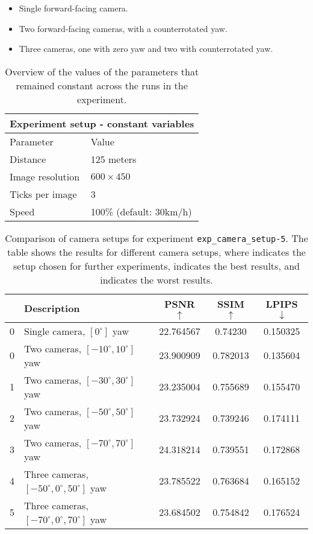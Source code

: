 \begin{itemize}
    \item Single forward-facing camera.
    \item Two forward-facing cameras, with a counterrotated yaw.
    \item Three cameras, one with zero yaw and two with counterrotated yaw.
\end{itemize}

\begin{table}[ht]
\centering
\setlength{\tabcolsep}{12pt}
\renewcommand{\arraystretch}{1.2}
\begin{tabular}{l l}
\multicolumn{2}{c}{\textbf{Experiment setup - constant variables}} \\
\hline
Parameter & Value \\
\hline
Distance  & 125 meters \\
Image resolution &  $600 \times 450$ \\
Ticks per image & 3 \\
Speed & 100\% (default: 30km/h) \\
\hline
\end{tabular}
\caption{Overview of the values of the parameters that remained constant across the runs in the experiment.}
\label{tab:camera-setup-stable-variables}
\end{table}


\begin{table}[ht]
\centering
\setlength{\tabcolsep}{6pt}
\renewcommand{\arraystretch}{1.5}
\begin{tabular}{l l | C{2.2} C{1.3} C{1.3}}
\hline
& \textbf{Description} & \textbf{PSNR $\uparrow$} & \textbf{SSIM $\uparrow$} & \textbf{LPIPS $\downarrow$} \\
 & Single camera, $[0^{\circ}]$ yaw & 22.764567 & 0.74230 & 0.150325 \\
0 &Two cameras, $[-10^{\circ}, 10^{\circ}]$ yaw & 23.900909 &  0.782013 &  0.135604 \\
1 & Two cameras, $[-30^{\circ}, 30^{\circ}]$ yaw &  23.235004 & 0.755689 & 0.155470 \\
2 & Two cameras, $[-50^{\circ}, 50^{\circ}]$ yaw & 23.732924 &  0.739246 & 0.174111 \\
3 & Two cameras, $[-70^{\circ}, 70^{\circ}]$ yaw &  24.318214 & 0.739551 & 0.172868 \\
4 & Three cameras,  $[-50^{\circ}, 0^{\circ}, 50^{\circ}]$ yaw & 23.785522 & 0.763684 & 0.165152 \\
5 & Three cameras,  $[-70^{\circ}, 0^{\circ}, 70^{\circ}]$ yaw & 23.684502 & 0.754842 &  0.176524 \\
\hline
\end{tabular}
\caption{Comparison of camera setups for experiment \texttt{exp\_camera\_setup-5}. The table shows the results for different camera setups, where  indicates the setup chosen for further experiments,  indicates the best results, and  indicates the worst results.}
\label{tab:exp_camera_setup-5}
\end{table}


